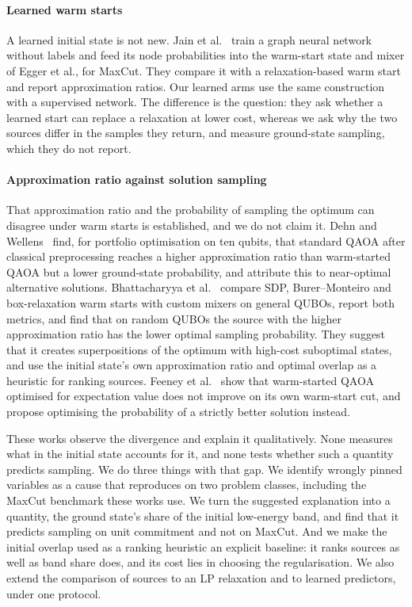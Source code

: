 \paragraph{Learned warm starts} A learned initial state is not new. Jain et al.~\cite{jain2022gnn} train a graph neural network without labels and feed its node probabilities into the warm-start state and mixer of Egger et al., for MaxCut. They compare it with a relaxation-based warm start and report approximation ratios. Our learned arms use the same construction with a supervised network. The difference is the question: they ask whether a learned start can replace a relaxation at lower cost, whereas we ask why the two sources differ in the samples they return, and measure ground-state sampling, which they do not report.

\paragraph{Approximation ratio against solution sampling} That approximation ratio and the probability of sampling the optimum can disagree under warm starts is established, and we do not claim it. Dehn and Wellens~\cite{dehn2023hybrid} find, for portfolio optimisation on ten qubits, that standard QAOA after classical preprocessing reaches a higher approximation ratio than warm-started QAOA but a lower ground-state probability, and attribute this to near-optimal alternative solutions. Bhattacharyya et al.~\cite{bhattacharyya2025qubo} compare SDP, Burer--Monteiro and box-relaxation warm starts with custom mixers on general QUBOs, report both metrics, and find that on random QUBOs the source with the higher approximation ratio has the lower optimal sampling probability. They suggest that it creates superpositions of the optimum with high-cost suboptimal states, and use the initial state's own approximation ratio and optimal overlap as a heuristic for ranking sources. Feeney et al.~\cite{feeney2024bsp} show that warm-started QAOA optimised for expectation value does not improve on its own warm-start cut, and propose optimising the probability of a strictly better solution instead.

These works observe the divergence and explain it qualitatively. None measures what in the initial state accounts for it, and none tests whether such a quantity predicts sampling. We do three things with that gap. We identify wrongly pinned variables as a cause that reproduces on two problem classes, including the MaxCut benchmark these works use. We turn the suggested explanation into a quantity, the ground state's share of the initial low-energy band, and find that it predicts sampling on unit commitment and not on MaxCut. And we make the initial overlap used as a ranking heuristic an explicit baseline: it ranks sources as well as band share does, and its cost lies in choosing the regularisation. We also extend the comparison of sources to an LP relaxation and to learned predictors, under one protocol.

